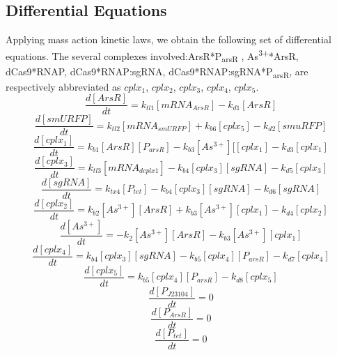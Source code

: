 \subsection{Differential Equations}
Applying mass action kinetic laws, we obtain the following set of differential equations. The several complexes involved:ArsR*P\textsubscript{arsR} , As\textsuperscript{3+}*ArsR, dCas9*RNAP, dCas9*RNAP:sgRNA, dCas9*RNAP:sgRNA*P\textsubscript{arsR}, are respectively abbreviated as $cplx_1$, $cplx_2$, $cplx_3$, $cplx_4$, $cplx_5$.
\begin{equation}
\frac{d[ArsR]}{dt}=k_{tl1}[mRNA_{ArsR}]-k_{d1}[ArsR]\tag{1}
\end{equation}
\begin{equation}
\frac{d[smURFP]}{dt}=k_{tl2}[mRNA_{smURFP}]+k_{b6}[cplx_5]-k_{d2}[smuRFP]\tag{2}
\end{equation}
\begin{equation}
\frac{d[cplx_1]}{dt}=k_{b1}[ArsR][P_{arsR}]-k_{b3}[As^{3+}][[cplx_1]-k_{d3}[cplx_1] \tag{3}
\end{equation}
\begin{equation}
\frac{d[cplx_3]}{dt}=k_{tl3}[mRNA_{dcplx1}]-k_{b4}[cplx_3][sgRNA]-k_{d5}[cplx_3] \tag{4}
\end{equation}
\begin{equation}
\frac{d[sgRNA]}{dt}=k_{tx4}[P_{tet}]-k_{b4}[cplx_3][sgRNA]-k_{d6}[sgRNA] \tag{5}
\end{equation}
\begin{equation}
\frac{d[cplx_2]}{dt}=k_{b2}[As^{3+}][ArsR]+k_{b3}[As^{3+}][cplx_1]-k_{d4}[cplx_2] \tag{6}
\end{equation}
\begin{equation}
\frac{d[As^{3+}]}{dt}=-k_{2}[As^{3+}][ArsR]-k_{b3}[As^{3+}][cplx_1] \tag{7}
\end{equation}
\begin{equation}
\frac{d[cplx_4]}{dt}=k_{b4}[cplx_3][sgRNA]-k_{b5}[cplx_4][P_{arsR}]-k_{d7}[cplx_4]\tag{8}
\end{equation}
\begin{equation}
\frac{d[cplx_5]}{dt}=k_{b5}[cplx_4][P_{arsR}]-k_{d8}[cplx_5]\tag{9}
\end{equation} 
\begin{equation}
\frac{d[P_{J23104}]}{dt}=0\tag{10}
\end{equation} 
\begin{equation}
\frac{d[P_{ArsR}]}{dt}=0\tag{11}
\end{equation} 
\begin{equation}
\frac{d[P_{tet}]}{dt}=0\tag{12}
\end{equation} 

